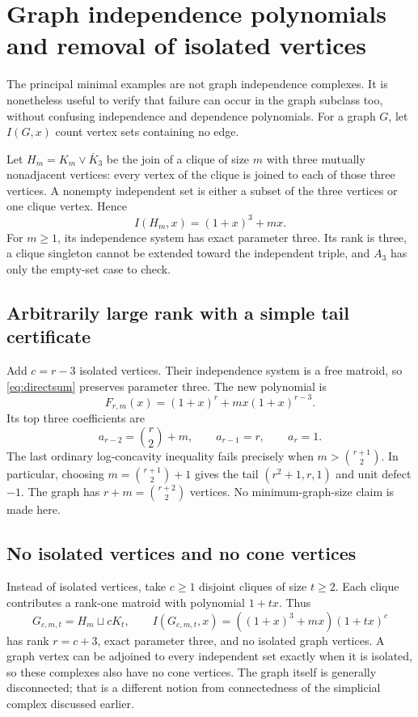 \documentclass[11pt,letterpaper]{article}
\numberwithin{equation}{section}
\theoremstyle{definition}
\theoremstyle{remark}
\begin{document}
\section{Graph independence polynomials and removal of isolated vertices}
\label{sec:graphs}
The principal minimal examples are not graph independence complexes.
It is nonetheless useful to verify that failure can occur in the graph
subclass too, without confusing independence and dependence polynomials.
For a graph $G$, let $I(G,x)$ count vertex sets containing no edge.

Let $H_m=K_m\vee\overline K_3$ be the join of a clique of size $m$ with
three mutually nonadjacent vertices: every vertex of the clique is joined
to each of those three vertices. A nonempty independent set is either a
subset of the three vertices or one clique vertex. Hence
\begin{equation}\label{eq:Hm}
 I(H_m,x)=(1+x)^3+mx.
\end{equation}
For $m\ge1$, its independence system has exact parameter three. Its rank
is three, a clique singleton cannot be extended toward the independent
triple, and $A_3$ has only the empty-set case to check.

\subsection{Arbitrarily large rank with a simple tail certificate}
Add $c=r-3$ isolated vertices. Their independence system is a free matroid,
so \eqref{eq:directsum} preserves parameter three. The new polynomial is
\begin{equation}\label{eq:graph-free}
 F_{r,m}(x)=(1+x)^r+mx(1+x)^{r-3}.
\end{equation}
Its top three coefficients are
\[
 a_{r-2}=\binom r2+m,\qquad a_{r-1}=r,\qquad a_r=1.
\]
The last ordinary log-concavity inequality fails precisely when
$m>\binom{r+1}{2}$. In particular, choosing
$m=\binom{r+1}{2}+1$ gives the tail $(r^2+1,r,1)$ and unit defect $-1$.
The graph has $r+m=\binom{r+2}{2}$ vertices. No minimum-graph-size claim is
made here.

\subsection{No isolated vertices and no cone vertices}
Instead of isolated vertices, take $c\ge1$ disjoint cliques of size
$t\ge2$. Each clique contributes a rank-one matroid with polynomial
$1+tx$. Thus
\begin{equation}\label{eq:graph-cliques}
 G_{c,m,t}=H_m\sqcup cK_t,
 \qquad I(G_{c,m,t},x)=((1+x)^3+mx)(1+tx)^c
\end{equation}
has rank $r=c+3$, exact parameter three, and no isolated graph vertices.
A graph vertex can be adjoined to every independent set exactly when it
is isolated, so these complexes also have no cone vertices.
The graph itself is generally disconnected; that is a different notion
from connectedness of the simplicial complex discussed earlier.
\end{document}
